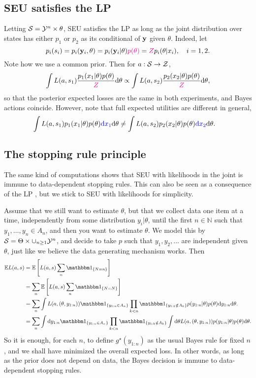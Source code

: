 \subsection{SEU satisfies the LP}
Letting $\mathcal{S} = \mathcal{Y}^n\times\theta$, SEU satisfies the LP as long as the joint distribution over states has either $p_1$ or $p_2$ as its conditional of $\mathbf{y}$ given $\theta$.
Indeed, let
$$
p_i(s_i) = p_i(\mathbf{y}_i,\theta) = p_i(\mathbf{y}_i\vert\theta)\textcolor{magenta}{p(\theta)} = \textcolor{magenta}{Z} p_i(\theta\vert x_i), \quad i=1,2.
$$
Note how we use a common prior. 
Then for $a:\mathcal{S}\rightarrow\mathcal{Z}$,
  $$ 
  \int L(a,s_1) \frac{p_1(x_1\vert\theta)p(\theta)}{\textcolor{magenta}{Z}} \mathrm{d}\theta \propto \int L(a,s_2) \frac{p_2(x_2\vert\theta)p(\theta)}{\textcolor{magenta}{Z}} \mathrm{d}\theta, 
  $$
  so that the posterior expected losses are the same in both experiments, and Bayes actions coincide.
  However, note that full expected utilities are different in general, 
  \begin{align*}
    \int L(a,s_1) p_1(x_1\vert\theta)p(\theta) \textcolor{blue}{\mathrm{d} x_1}\mathrm{d}\theta
    &\neq \int L(a,s_2) p_2(x_2\vert\theta)p(\theta) \textcolor{blue}{\mathrm{d} x_2}\mathrm{d}\theta.
  \end{align*}

\subsection{The stopping rule principle}
The same kind of computations shows that SEU with likelihoods in the joint  is immune to data-dependent stopping rules. 
This can also be seen as a consequence of the LP \citep{BeWo88}, but we stick to SEU with likelihoods for simplicity.

Assume that we still want to estimate $\theta$, but that we collect data one item at a time, independently from some distribution $y_i\vert\theta$, until the first $n\in\mathbb{N}$ such that $y_1,\dots,y_n \in A_n$, and then you want to estimate $\theta$. 
We model this by $\mathcal{S} = \Theta \times \cup_{n\geq 1} \mathcal{Y}^n$, and decide to take $p$ such that $y_1,y_2,\dots$ are independent given $\theta$, just like we believe the data generating mechanism works. 
Then
\begin{align*}
   \mathbb E L(a,s) &= \mathbb E \left [ L(a,s) \sum_{n} \IND{N=n} \right ]\\
    &= \sum_{n} \mathbb E \left [ L(a,s) \sum_{n} \IND{N=N} \right ]\\
    &= \sum_{n} \int L(a,(\theta,y_{1:n})) \IND{y_{1:n}\in A_n}\prod_{k<n}\IND{y_{1:k}\notin A_k} p(y_{1:n}\vert\theta) p(\theta) \d y_{1:n}\d \theta.\\
    &= \sum_n \int\d y_{1:n} \IND{y_{1:n}\in A_n}\prod_{k<n}\IND{y_{1:k} \notin A_k} \int \d\theta L(a,(\theta,y_{1:n}))  p(y_{1:n}\vert\theta) p(\theta) \d\theta.
\end{align*}
So it is enough, for each $n$, to define $g^\star(y_{1:n})$ as the usual Bayes rule for fixed $n$, and we shall have minimized the overall expected loss.
In other words, as long as the prior does not depend on data, the Bayes decision is immune to data-dependent stopping rules.

